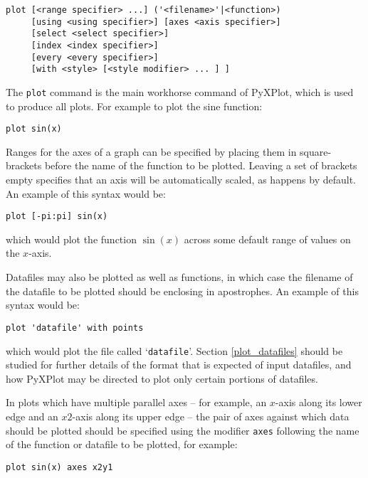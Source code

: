 \documentclass[a4paper,onecolumn,11pt]{book}
\begin{document}
\begin{verbatim}
plot [<range specifier> ...] ('<filename>'|<function>)
     [using <using specifier>] [axes <axis specifier>]
     [select <select specifier>]
     [index <index specifier>]
     [every <every specifier>]
     [with <style> [<style modifier> ... ] ]
\end{verbatim}

The {\tt plot} command is the main workhorse command of PyXPlot, which is used
to produce all plots. For example to plot the sine function:

\begin{verbatim}
plot sin(x)
\end{verbatim}

Ranges for the axes of a graph can be specified by placing them in
square-brackets before the name of the function to be plotted. Leaving a set of
brackets empty specifies that an axis will be automatically scaled, as happens
by default. An example of this syntax would be:

\begin{verbatim}
plot [-pi:pi] sin(x)
\end{verbatim}

\noindent which would plot the function $\sin(x)$ across some default range of
values on the $x$-axis.

Datafiles may also be plotted as well as functions, in which case the filename
of the datafile to be plotted should be enclosing in apostrophes. An example of
this syntax would be:

\begin{verbatim}
plot 'datafile' with points
\end{verbatim}

\noindent which would plot the file called `{\tt datafile}'.  Section
\ref{plot_datafiles} should be studied for further details of the format that is
expected of input datafiles, and how PyXPlot may be directed to plot only
certain portions of datafiles.

In plots which have multiple parallel axes -- for example, an $x$-axis along its
lower edge and an $x2$-axis along its upper edge -- the pair of axes against
which data should be plotted should be specified using the modifier {\tt axes}
following the name of the function or datafile to be plotted, for example:

\begin{verbatim}
plot sin(x) axes x2y1
\end{verbatim}
\end{document}
